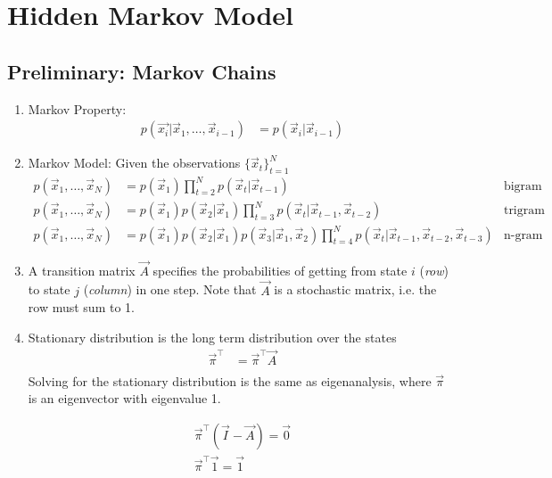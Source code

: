 \documentclass[12pt,twoside]{article}
\begin{document}
\newpage


\section {Hidden Markov Model}
\subsection{Preliminary: Markov Chains}

\begin{enumerate}
	\item Markov Property:
		\begin{align*}
			p(\vec{x_i} \vert \vec{x}_1, \ldots, \vec{x}_{i-1}) &= p(\vec{x}_i \vert \vec{x}_{i-1})
		\end{align*}
		
	\item Markov Model: Given the observations $\lbrace \vec{x}_t \rbrace_{t=1}^N$
		\begin{align*}
			p(\vec{x}_1, \ldots, \vec{x}_N) &= p(\vec{x}_1)\prod_{t=2}^N p(\vec{x}_t \vert \vec{x}_{t-1}) & \text{bigram model}\\
			p(\vec{x}_1, \ldots, \vec{x}_N) &= p(\vec{x}_1)p(\vec{x}_2\vert \vec{x}_1 )\prod_{t=3}^N p(\vec{x}_t \vert \vec{x}_{t-1},\vec{x}_{t-2}) & \text{trigram model}\\
			p(\vec{x}_1, \ldots, \vec{x}_N) &= p(\vec{x}_1)p(\vec{x}_2\vert \vec{x}_1 )p(\vec{x}_3\vert \vec{x}_1,\vec{x}_2 )\prod_{t=4}^N p(\vec{x}_t \vert \vec{x}_{t-1},\vec{x}_{t-2},\vec{x}_{t-3}) & \text{n-gram model}
		\end{align*}	
		
		\item A transition matrix $\vec{A}$ specifies the probabilities of getting from state $i$ (\textit{row}) to state $j$ (\textit{column}) in one step. Note that $\vec{A}$ is a stochastic matrix, i.e. the row must sum to 1.
		
		\item Stationary distribution is the long term distribution over the states
					\begin{align*}
						\vec{\pi}^\top & = \vec{\pi}^\top  \vec{A}\\
					\end{align*}
				Solving for the stationary distribution is the same as eigenanalysis, where $\vec{\pi}$ is an eigenvector with eigenvalue 1.	
				
				\begin{align*}
					\vec{\pi}^\top(\vec{I} - \vec{A}) = \vec{0}\\
					\vec{\pi}^\top \vec{1} = \vec{1}	
				\end{align*}
				

\end{enumerate}
\end{document}

